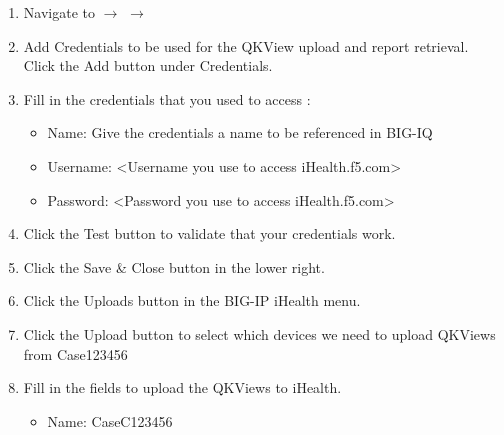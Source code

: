 \documentclass[letterpaper,10pt,english]{sphinxmanual}
\begin{document}
\begin{enumerate}
\item {} 
Navigate to   \(\rightarrow\)  \(\rightarrow\) 
\begin{quote}

\end{quote}

\item {} 
Add Credentials to be used for the QKView upload and report
retrieval. Click the Add button under Credentials.


\item {} 
Fill in the credentials that you used to access :
\begin{itemize}
\item {} 
Name: Give the credentials a name to be referenced in BIG-IQ

\item {} 
Username: \textless{}Username you use to access iHealth.f5.com\textgreater{}

\item {} 
Password: \textless{}Password you use to access iHealth.f5.com\textgreater{}

\end{itemize}


\item {} 
Click the Test button to validate that your credentials work.

\item {} 
Click the Save \& Close button in the lower right.

\item {} 
Click the Uploads button in the BIG-IP iHealth menu.

\item {} 
Click the Upload button to select which devices we need to upload
QKViews from Case123456

\item {} 
Fill in the fields to upload the QKViews to iHealth.
\begin{itemize}
\item {} 
Name: CaseC123456


\end{itemize}
\end{enumerate}
\end{document}
